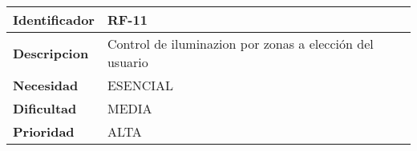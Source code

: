\begin{center}
    \begin{tabular}{|p{2.6cm}|p{12cm}|}
    \hline
    \textbf{Identificador} & RF-11\\
    \hline
    \textbf{Descripcion} & Control de iluminazion por zonas a elección del usuario\\
    \hline
    \textbf{Necesidad} & ESENCIAL\\
    \hline
    \textbf{Dificultad} & MEDIA\\
    \hline
    \textbf{Prioridad} & ALTA\\
    \hline
    \end{tabular}
\end{center}
